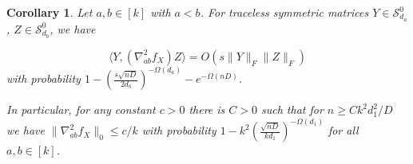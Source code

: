 \documentclass{article}
\newtheorem{corollary}[theorem]{Corollary}
\newcommand\Sym{\mathcal{S}}
\newcommand\rv{X}
\newcommand{\TODO}[1]{{\color{blue}[TODO: #1]}}
\begin{document}
\begin{corollary}\label{cor:off-diag-hess} Let $a,b \in [k]$ with $a < b$. For traceless symmetric matrices $Y \in \Sym^0_{d_a}$, $Z \in \Sym^0_{d_b}$, we have 

$$ \langle Y,  \left( \nabla^2_{ab} f_{\rv} \right) Z \rangle
= O \left(s \|Y\|_F\|Z\|_F\right)
$$
with probability %
$1 - \left(\frac {s \sqrt{nD}}{2d_b}\right)^{ - \Omega(d_a)} - e^{- \Omega(nD)}$.

In particular, for any constant $c>0$ there is $C>0$ such that for $n \geq C k^2 d_1^2/D$ we have $\|\nabla^2_{ab} f_{\rv}\|_0 \leq c/k$ with probability $1 - k^2 \left(\frac {\sqrt{nD}}{kd_1}\right)^{ - \Omega(d_1)}$ for all $a,b \in [k]$. 


\end{corollary}
\end{document}
